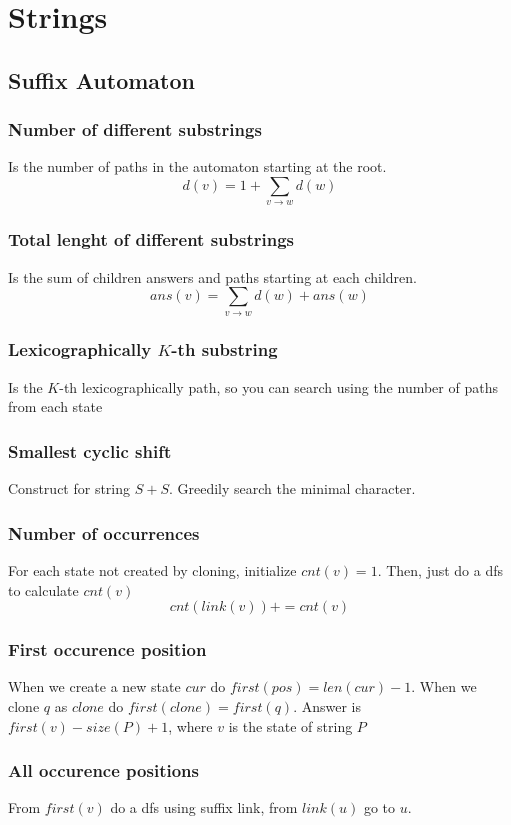 \chapter{Strings}


\section{Suffix Automaton}
\subsection{Number of different substrings}
        Is the number of paths in the automaton starting at the root.
        $$d(v) = 1 + \sum_{v \rightarrow w} d(w)$$

\subsection{Total lenght of different substrings}
        Is the sum of children answers and paths starting 
        at each children.
        $$ans(v) = \sum_{v \rightarrow w} d(w) + ans(w)$$


\subsection{Lexicographically $K$-th substring}
        Is the $K$-th lexicographically path, so you can search using the number of paths from each state


\subsection{Smallest cyclic shift}
        Construct for string $S + S$. Greedily search 
        the minimal character.


\subsection{Number of occurrences}
        For each state not created by cloning, initialize $cnt(v) = 1$. 
        Then, just do a dfs to calculate $cnt(v)$
        $$cnt(link(v)) += cnt(v)$$

\subsection{First occurence position}
        When we create a new state $cur$ do $first(pos) = len(cur) - 1$.
        When we clone $q$ as $clone$ do $first(clone) = first(q)$.
        Answer is $first(v) - size(P) + 1$, where $v$ is the state of string $P$

\subsection{All occurence positions}
        From $first(v)$ do a dfs using suffix link, from $link(u)$ go to $u$.
